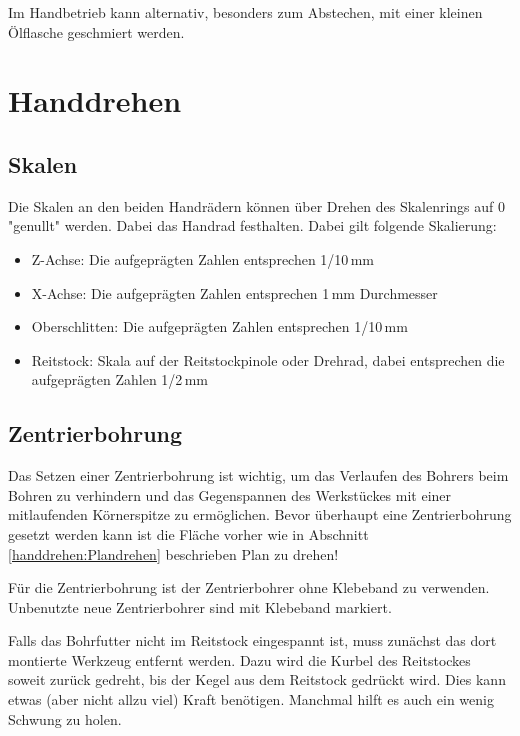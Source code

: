 \documentclass{\basedir/fablab-document}
\begin{document}
Im Handbetrieb kann alternativ, besonders zum Abstechen, mit einer kleinen Ölflasche geschmiert werden. 

\newpage
\section{Handdrehen}
\subsection{Skalen}

Die Skalen an den beiden Handrädern können über Drehen des Skalenrings auf 0 "genullt" werden. Dabei das Handrad festhalten. Dabei gilt folgende Skalierung:
\begin{itemize}
\item Z-Achse: Die aufgeprägten Zahlen entsprechen 1/10\,mm 
\item X-Achse: Die aufgeprägten Zahlen entsprechen 1\,mm Durchmesser
\item Oberschlitten: Die aufgeprägten Zahlen entsprechen 1/10\,mm 
\item Reitstock: Skala auf der Reitstockpinole oder Drehrad, dabei entsprechen die aufgeprägten Zahlen 1/2\,mm
\end{itemize}


\subsection{Zentrierbohrung}
\label{handdrehen:zentrierbohrung}
Das Setzen einer Zentrierbohrung ist wichtig, um das Verlaufen des Bohrers beim Bohren zu verhindern und das Gegenspannen des Werkstückes mit einer mitlaufenden Körnerspitze zu ermöglichen. Bevor überhaupt eine Zentrierbohrung gesetzt werden kann ist die Fläche vorher wie in Abschnitt \ref{handdrehen:Plandrehen} beschrieben Plan zu drehen!


Für die Zentrierbohrung ist der Zentrierbohrer ohne Klebeband zu verwenden. Unbenutzte neue Zentrierbohrer sind mit Klebeband markiert.

Falls das Bohrfutter nicht im Reitstock eingespannt ist, muss zunächst das dort montierte Werkzeug entfernt werden.
Dazu wird die Kurbel des Reitstockes soweit zurück gedreht, bis der  Kegel aus dem Reitstock gedrückt wird.
Dies kann etwas (aber nicht allzu viel) Kraft benötigen. Manchmal hilft es auch ein wenig \grqq Schwung\grqq{} zu holen.
\end{document}
